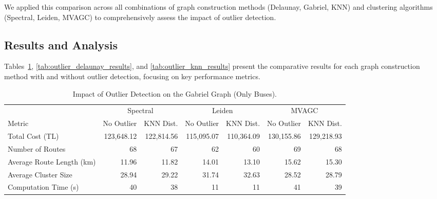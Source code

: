 We applied this comparison across all combinations of graph construction methods (Delaunay, Gabriel, KNN) and clustering algorithms (Spectral, Leiden, MVAGC) to comprehensively assess the impact of outlier detection.

\subsection{Results and Analysis}
\label{subsec:outlier_results}

Tables~\ref{tab:outlier_gabriel_results}, \ref{tab:outlier_delaunay_results}, and \ref{tab:outlier_knn_results} present the comparative results for each graph construction method with and without outlier detection, focusing on key performance metrics.

\begin{table}[h]
\centering
\scriptsize{
\setlength{\tabcolsep}{4pt}
\begin{tabular}{lrrrrrr}
\toprule
& \multicolumn{2}{c}{Spectral} & \multicolumn{2}{c}{Leiden} & \multicolumn{2}{c}{MVAGC} \\
\cmidrule(lr){2-3} \cmidrule(lr){4-5} \cmidrule(lr){6-7}
Metric & No Outlier & KNN Dist. & No Outlier & KNN Dist. & No Outlier & KNN Dist. \\
\midrule
Total Cost (TL) & 123,648.12 & 122,814.56 & 115,095.07 & 110,364.09 & 130,155.86 & 129,218.93 \\
Number of Routes & 68 & 67 & 62 & 60 & 69 & 68 \\
Average Route Length (km) & 11.96 & 11.82 & 14.01 & 13.10 & 15.62 & 15.30 \\
Average Cluster Size & 28.94 & 29.22 & 31.74 & 32.63 & 28.52 & 28.79 \\
Computation Time (s) & 40 & 38 & 11 & 11 & 41 & 39 \\ 
\bottomrule
\end{tabular}
}
\caption{Impact of Outlier Detection on the Gabriel Graph (Only Buses).}
\label{tab:outlier_gabriel_results}
\end{table}

